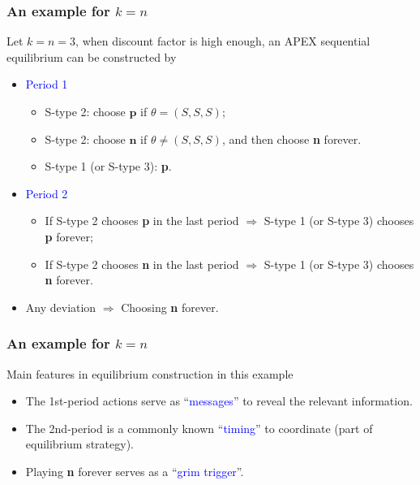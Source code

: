 \documentclass[8pt]{beamer}
\begin{document}
\begin{frame}
  \frametitle{An example for $k=n$}
\begin{center}
\end{center}

  
Let \alert{$k=n=3$}, when discount factor is high enough, an APEX sequential equilibrium can be constructed by
\begin{itemize}

\item \textcolor{blue}{Period 1}
\begin{itemize}
\item S-type 2: choose $\textbf{p}$ if $\theta=(S,S,S)$;
\item S-type 2: choose $\textbf{n}$ if $\theta\neq (S,S,S)$, and then choose \alert{\textbf{n} forever}.
\item S-type 1 (or S-type 3): \textbf{p}.
\end{itemize}

\item \textcolor{blue}{Period 2}
\begin{itemize}
\item If S-type 2 chooses \textbf{p} in the last period $\Rightarrow$ S-type 1 (or S-type 3) chooses \textbf{p} forever; 
\item If S-type 2 chooses \textbf{n} in the last period $\Rightarrow$ S-type 1 (or S-type 3) chooses \alert{\textbf{n} forever}.
\end{itemize}
 
 \item Any deviation $\Rightarrow$ Choosing \alert<1->{\textbf{n} forever}.
\end{itemize}

\end{frame}


\begin{frame}
  \frametitle{An example for $k=n$}
Main features in equilibrium construction in this example
\begin{itemize}
\item The \alert{1st-period} actions serve as ``\textcolor{blue}{messages}'' to reveal the relevant information.
\item The \alert{2nd-period} is a commonly known ``\textcolor{blue}{timing}'' to coordinate (part of equilibrium strategy).
\item \alert{Playing \textbf{n} forever} serves as a ``\textcolor{blue}{grim trigger}''.
\end{itemize}  
\end{frame}
\end{document}
